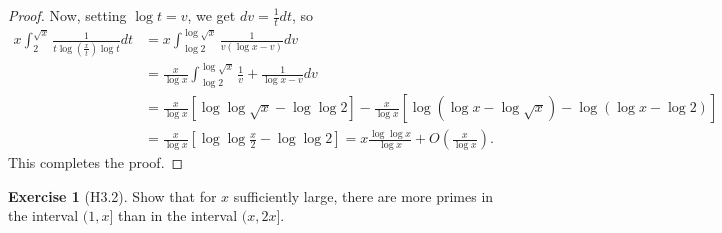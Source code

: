 \documentclass[reqno]{amsart}
\theoremstyle{definition}
\newtheorem{exercise}[theorem]{Exercise}
\theoremstyle{remark}
\begin{document}
\begin{proof}
    Now, setting
    $\log t = v$, we get
    $dv = \frac{1}{t} dt$, so
    \begin{align*}
        x \int_{2}^{\sqrt{x} } 
        \frac{1}{t \log \left( \frac{x}{t} \right) \log t} dt
        &= x 
        \int_{\log 2}^{\log \sqrt{x} } 
        \frac{1}{v \left( \log x
        -v\right) } dv\\
        &= \frac{x}{\log x}
        \int_{\log 2}^{\log \sqrt{x} } 
        \frac{1}{v} + \frac{1}{\log x - v} dv\\
        &= \frac{x}{\log x} \left[ \log \log \sqrt{x} 
        - \log \log 2 \right] 
        - \frac{x}{\log x}
        \left[ \log \left( \log x - \log \sqrt{x}  \right) -
        \log \left( \log x - \log 2 \right) \right] \\
        &= \frac{x}{\log x} \left[ 
        \log \log \frac{x}{2} - \log \log 2 \right] 
        = x \frac{\log \log x}{\log x} + 
        O \left( \frac{x}{\log x} \right) .
    \end{align*}
    This completes the proof.
\end{proof}

\begin{exercise}[H3.2]
    Show that for $x$ sufficiently large, there
    are more primes in the interval
    $(1, x]$ than in the interval
    $(x, 2x]$.
\end{exercise}
\end{document}
